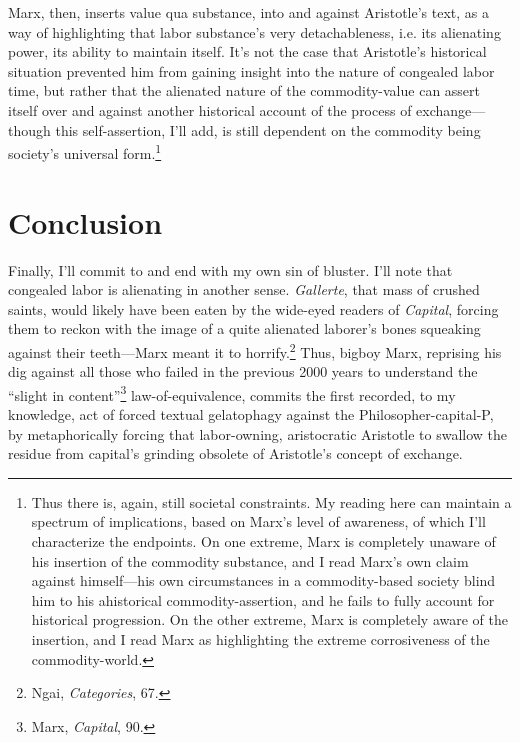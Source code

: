 \documentclass[12pt]{article}
\begin{document}
Marx, then, inserts value qua substance, into and against Aristotle's text, as a way of highlighting that labor substance's very detachableness, i.e. its alienating power, its ability to maintain itself. It's not the case that Aristotle's historical situation prevented him from gaining insight into the nature of congealed labor time, but rather that the alienated nature of the commodity-value can assert itself over and against another historical account of the process of exchange---though this self-assertion, I'll add, is still dependent on the commodity being society's universal form.\footnote{Thus there is, again, still societal constraints. My reading here can maintain a spectrum of implications, based on Marx's level of  awareness, of which I'll characterize the endpoints. On one extreme, Marx is completely unaware of his insertion of the commodity substance, and I read Marx's own claim against himself---his own circumstances in a commodity-based society blind him to his ahistorical commodity-assertion, and he fails to fully account for historical progression. On the other extreme, Marx is completely aware of the insertion, and I read Marx as highlighting the extreme corrosiveness of the commodity-world.}

\section{Conclusion}
Finally, I'll commit to and end with my own sin of bluster. I'll note that congealed labor is alienating in another sense. \textit{Gallerte}, that mass of crushed saints, would likely have been eaten by the wide-eyed readers of \textit{Capital}, forcing them to reckon with the image of a quite alienated laborer's bones squeaking against their teeth---Marx meant it to horrify.\footnote{Ngai, \textit{Categories}, 67.} Thus, bigboy Marx, reprising his dig against all those who failed in the previous 2000 years to understand the ``slight in content''\footnote{Marx, \textit{Capital}, 90.} law-of-equivalence, commits the first recorded, to my knowledge, act of forced textual gelatophagy against the Philosopher-capital-P, by metaphorically forcing that labor-owning, aristocratic Aristotle to swallow the residue from capital's grinding obsolete of Aristotle's concept of exchange.
\end{document}

